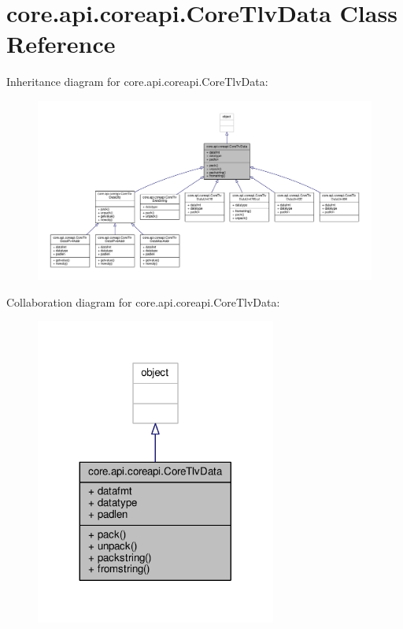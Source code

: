 \hypertarget{classcore_1_1api_1_1coreapi_1_1_core_tlv_data}{\section{core.\+api.\+coreapi.\+Core\+Tlv\+Data Class Reference}
\label{classcore_1_1api_1_1coreapi_1_1_core_tlv_data}
}


Inheritance diagram for core.\+api.\+coreapi.\+Core\+Tlv\+Data\+:
\nopagebreak
\begin{figure}[H]
\begin{center}
\leavevmode
\includegraphics[width=350pt]{classcore_1_1api_1_1coreapi_1_1_core_tlv_data__inherit__graph}
\end{center}
\end{figure}


Collaboration diagram for core.\+api.\+coreapi.\+Core\+Tlv\+Data\+:
\nopagebreak
\begin{figure}[H]
\begin{center}
\leavevmode
\includegraphics[width=224pt]{classcore_1_1api_1_1coreapi_1_1_core_tlv_data__coll__graph}
\end{center}
\end{figure}
